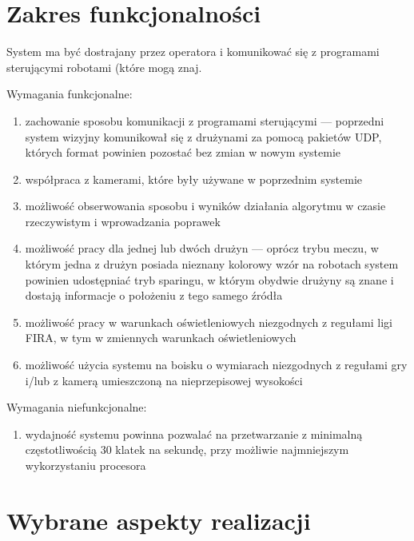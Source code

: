 \documentclass[polish,12pt]{aghthesis}
\begin{document}
\section{Zakres funkcjonalności}
\label{sec:zakres-funkcjonalnosci}
% 

System ma być dostrajany przez operatora i komunikować się z programami
sterującymi robotami (które mogą znaj.

Wymagania funkcjonalne:
\begin{enumerate}
\item zachowanie sposobu komunikacji z programami sterującymi --- poprzedni
system wizyjny komunikował się z drużynami za pomocą pakietów UDP, których
format powinien pozostać bez zmian w nowym systemie
\item współpraca z kamerami, które były używane w poprzednim systemie
\item możliwość obserwowania sposobu i wyników działania algorytmu w czasie
rzeczywistym i wprowadzania poprawek
\item możliwość pracy dla jednej lub dwóch drużyn --- oprócz trybu meczu, w 
którym jedna z drużyn posiada nieznany kolorowy wzór na robotach system powinien
udostępniać tryb sparingu, w którym obydwie drużyny są znane i dostają 
informacje o położeniu z tego samego źródła
\item możliwość pracy w warunkach oświetleniowych niezgodnych z regułami ligi 
FIRA, w tym w zmiennych warunkach oświetleniowych
\item możliwość użycia systemu na boisku o wymiarach niezgodnych z regułami gry
i/lub z kamerą umieszczoną na nieprzepisowej wysokości

\end{enumerate}
Wymagania niefunkcjonalne:
\begin{enumerate}
\item wydajność systemu powinna pozwalać na przetwarzanie z minimalną
częstotliwością 30 klatek na sekundę, przy możliwie najmniejszym wykorzystaniu
procesora
\end{enumerate}



\section{Wybrane aspekty realizacji}
\label{sec:wybrane-aspekty-realizacji}
\end{document}
